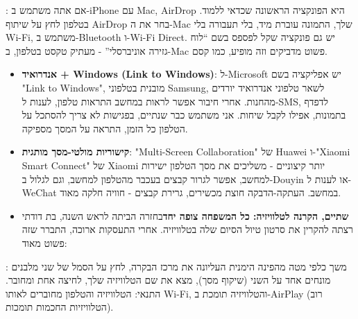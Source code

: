 


: אם אתה משתמש ב-iPhone עם Mac, AirDrop היא הפונקציה הראשונה שכדאי ללמוד. בטלפון לחץ על שיתוף AirDrop בחר את ה-Mac שלך, התמונה עוברת מיד, בלי תעבורה בלי Wi-Fi, משתמש ב-Bluetooth ו-Wi-Fi Direct. יש גם פונקציה שקל לפספס בשם “לוח גזירה אוניברסלי” - מעתיק טקסט בטלפון, ב-Mac פשוט מדביקים וזה מופיע, כמו קסם.

\begin{itemize}
  \item \textbf{אנדרואיד + Windows (Link to Windows)}: ל-Microsoft יש אפליקציה בשם "Link to Windows", מובנית בטלפוני Samsung, לשאר טלפוני אנדרואיד יורדים מהחנות. אחרי חיבור אפשר לראות במחשב התראות טלפון, לענות ל-SMS, לדפדף בתמונות, אפילו לקבל שיחות. אני משתמש כבר שנתיים, בפגישות לא צריך להסתכל על הטלפון כל הזמן, התראה על המסך מספיקה.
  \item \textbf{קישוריות מולטי-מסך מותגית}: "Multi-Screen Collaboration" של Huawei ו-"Xiaomi Smart Connect" של Xiaomi יותר קיצוניים - משליכים את מסך הטלפון ישירות למחשב, אפשר לגרור קבצים בעכבר מהטלפון למחשב, וגם לגלול ב-Douyin או לענות ל-WeChat במחשב. העתקה-הדבקה חוצת מכשירים, גרירת קבצים - חוויה חלקה מאוד.
  \item \textbf{שתיים, הקרנה לטלוויזיה: כל המשפחה צופה יחד}בחזרה הביתה לראש השנה, בת דודתי רצתה להקרין את סרטון טיול הסיום שלה בטלוויזיה. אחרי התעסקות ארוכה, התברר שזה פשוט מאוד:
\end{itemize}


: משך כלפי מטה מהפינה הימנית העליונה את מרכז הבקרה, לחץ על הסמל של שני מלבנים מונחים אחד על השני (שיקוף מסך), מצא את שם הטלוויזיה שלך, לחיצה אחת ומחובר. התנאי: הטלוויזיה והטלפון מחוברים לאותו Wi-Fi, והטלוויזיה תומכת ב-AirPlay (רוב הטלוויזיות החכמות תומכות).

